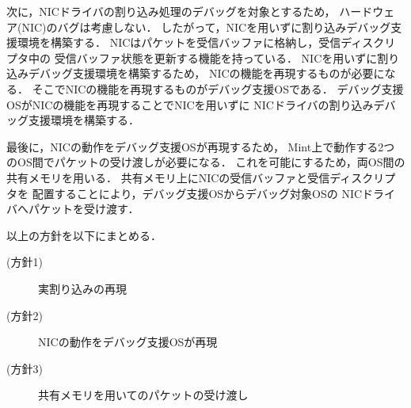 \documentclass[tanilab-enum]{graduate}
\begin{document}
次に，NICドライバの割り込み処理のデバッグを対象とするため，
ハードウェア(NIC)のバグは考慮しない．
したがって，NICを用いずに割り込みデバッグ支援環境を構築する．
NICはパケットを受信バッファに格納し，受信ディスクリプタ中の
受信バッファ状態を更新する機能を持っている．
NICを用いずに割り込みデバッグ支援環境を構築するため，
NICの機能を再現するものが必要になる．
そこでNICの機能を再現するものがデバッグ支援OSである．
デバッグ支援OSがNICの機能を再現することでNICを用いずに
NICドライバの割り込みデバッグ支援環境を構築する．

最後に，NICの動作をデバッグ支援OSが再現するため，
Mint上で動作する2つのOS間でパケットの受け渡しが必要になる．
これを可能にするため，両OS間の共有メモリを用いる．
共有メモリ上にNICの受信バッファと受信ディスクリプタを
配置することにより，デバッグ支援OSからデバッグ対象OSの
NICドライバへパケットを受け渡す．

以上の方針を以下にまとめる．
\begin{description}
    \item[(方針1)]実割り込みの再現
    \item[(方針2)]NICの動作をデバッグ支援OSが再現
    \item[(方針3)]共有メモリを用いてのパケットの受け渡し

\end{description}
\end{document}
